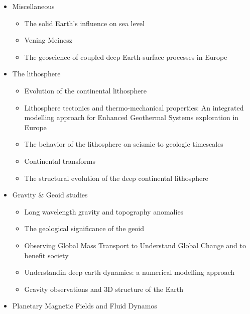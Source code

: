 \begin{itemize}
\item Miscellaneous
   \begin{itemize}
   \item The solid Earth's influence on sea level \cite{conr13}  
   \item Vening Meinesz \cite{vlaa89}
   \item The geoscience of coupled deep Earth-surface processes in Europe \cite{clzb07}
   \end{itemize}

\item The lithosphere
   \begin{itemize}
   \item [\twothousandfive] Evolution of the continental lithosphere \cite{slee05}
   \item [\twothousandten] Lithosphere tectonics and thermo-mechanical properties: An integrated modelling
         approach for Enhanced Geothermal Systems exploration in Europe \cite{clvz10}
   \item [\twothousandthirteen] The behavior of the lithosphere on seismic to geologic timescales \cite{wazh13}
   \item [\twothousandfourteen] Continental transforms \cite{noto14}
   \item [\twothousandseventeen] The structural evolution of the deep continental lithosphere \cite{comm17}
   \end{itemize}

\item Gravity \& Geoid studies
   \begin{itemize}
   \item Long wavelength gravity and topography anomalies \cite{wada81}
   \item The geological significance of the geoid \cite{chas85}
   \item Observing Global Mass Transport to Understand Global Change and to benefit society \cite{pabb15}
   \item Understandin deep earth dynamics: a numerical modelling approach \cite{siag17}
   \item Gravity observations and 3D structure of the Earth \cite{ricl06}\\
   \end{itemize}

\item Planetary Magnetic Fields and Fluid Dynamos \cite{jone11}



\end{itemize}
